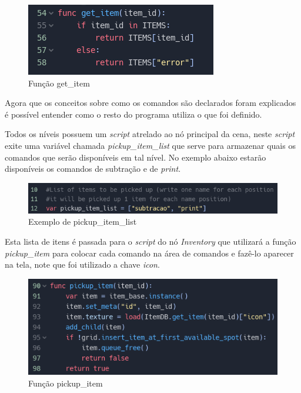 \begin{figure}[H]
    \includegraphics[scale=0.8]{../figuras/funcao_get_item.png}
    \caption{Função get\_item}
\end{figure}

Agora que os conceitos sobre como os comandos são declarados foram explicados é
possível entender como o resto do programa utiliza o que foi definido.

Todos os níveis possuem um \textit{script} atrelado ao nó principal da cena, 
neste \textit{script} exite uma variável chamada \textit{pickup\_item\_list} que
serve para armazenar quais os comandos que serão disponíveis em tal nível. No 
exemplo abaixo estarão disponíveis os comandos de subtração e de \textit{print}.

\begin{figure}[H]
    \includegraphics[scale=0.8]{../figuras/item_list.png}
    \caption{Exemplo de pickup\_item\_list}
\end{figure}

Esta lista de itens é passada para o \textit{script} do nó \textit{Inventory}
que utilizará a função \textit{pickup\_item} para colocar cada comando na área 
de comandos e fazê-lo aparecer na tela, note que foi utilizado a chave 
\textit{icon}.

\begin{figure}[H]
    \includegraphics[scale=0.8]{../figuras/pickup_item.png}
    \caption{Função pickup\_item}
\end{figure}

